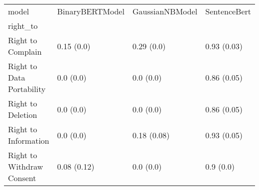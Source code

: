 \begin{tabular}{llll}
\toprule
model & BinaryBERTModel & GaussianNBModel & SentenceBert \\
right\_to                  &                 &                 &              \\
\midrule
Right to Complain         &      0.15 (0.0) &      0.29 (0.0) &  0.93 (0.03) \\
Right to Data Portability &       0.0 (0.0) &       0.0 (0.0) &  0.86 (0.05) \\
Right to Deletion         &       0.0 (0.0) &       0.0 (0.0) &  0.86 (0.05) \\
Right to Information      &       0.0 (0.0) &     0.18 (0.08) &  0.93 (0.05) \\
Right to Withdraw Consent &     0.08 (0.12) &       0.0 (0.0) &    0.9 (0.0) \\
\bottomrule
\end{tabular}
